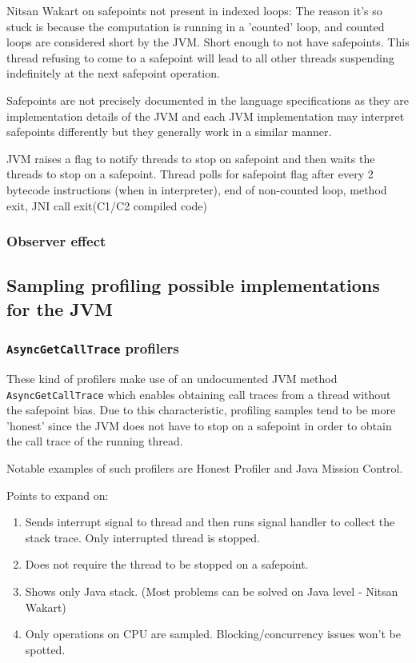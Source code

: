 \documentclass[..thesis.tex]{subfiles}
\begin{document}
Nitsan Wakart on safepoints not present in indexed loops: The reason it's so stuck is because the computation is running in a 'counted' loop, and counted loops are considered short by the JVM. Short enough to not have safepoints. This thread refusing to come to a safepoint will lead to all other threads suspending indefinitely at the next safepoint operation.


Safepoints are not precisely documented in the language specifications as they are implementation details of the JVM and each JVM implementation may interpret safepoints differently but they generally work in a similar manner.

JVM raises a flag to notify threads to stop on safepoint and then waits the threads to stop on a safepoint. Thread polls for safepoint flag after every 2 bytecode instructions (when in interpreter), end of non-counted loop, method exit, JNI call exit(C1/C2 compiled code)

\subsubsection{Observer effect}

\subsection{Sampling profiling possible implementations for the JVM}



\subsubsection{\texttt{AsyncGetCallTrace} profilers}
These kind of profilers make use of an undocumented JVM method \texttt{Async\-Get\-Call\-Trace} \cite{agct_source} which enables obtaining call traces from a thread without the safepoint bias. Due to this characteristic, profiling samples tend to be more 'honest' since the JVM does not have to stop on a safepoint in order to obtain the call trace of the running thread.

Notable examples of such profilers are Honest Profiler and Java Mission Control. 


Points to expand on:
\begin{enumerate}
	\item Sends interrupt signal to thread and then runs signal handler to collect the stack trace. Only interrupted thread is stopped.
	\item Does not require the thread to be stopped on a safepoint.
	\item Shows only Java stack. (Most problems can be solved on Java level - Nitsan Wakart)
	\item Only operations on CPU are sampled. Blocking/concurrency issues won't be spotted.
\end{enumerate}
\end{document}
